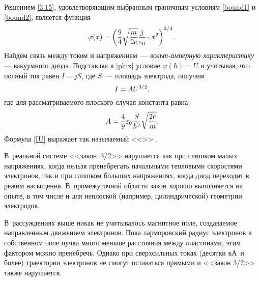 Решением \eqref{3.15}, удовлетворяющим выбранным граничным условиям
\eqref{bound1} и \eqref{bound2},
является функция
\begin{equation}
\eqmark{phix}
    \varphi(x) = 
    \left(
    \frac{9}{4}\sqrt{\frac{m}{2e}}\frac{j}{\varepsilon_0} \cdot x^2
    \right)^{2/3}.
\end{equation}
Найдём связь между током и напряжением~---
\emph{вольт-амперную характеристику} --- вакуумного диода.
Подставляя в \eqref{phix} условие $\varphi(h)=U$
и учитывая, что полный ток равен $I=jS$, 
где $S$~--- площадь электрода, получим
\begin{equation}
\eqmark{IU}
    I = A U^{3/2},
\end{equation}
где для рассматриваемого плоского случая константа равна 
\begin{equation}\eqmark{IU_flat}
A=\frac{4}{9}\varepsilon_0\frac{S}{h^2}\sqrt{\frac{2e}{m}}.
\end{equation}
Формула \eqref{IU} выражает так называемый <<>> .

В~реальной системе <<закон~3/2>> нарушается как при слишком малых напряжениях, 
когда нельзя пренебрегать начальными тепловыми скоростями электронов, 
так и при слишком больших напряжениях, когда диод переходит в режим насыщения. 
В~промежуточной области закон хорошо выполняется на опыте, в том числе и для
неплоской (например, цилиндрической) геометрии электродов.

\begin{lab:note}
В~рассуждениях выше никак не учитывалось магнитное поле, создаваемое
направленным движением электронов. 
Пока ларморовский радиус электронов в собственном поле пучка 
много меньше расстояния между пластинами, этим фактором можно пренебречь.
Однако при сверхсильных токах (десятки кА~и более) траектории 
электронов не смогут оставаться прямыми и <<закон 3/2>> также нарушается.
\end{lab:note}



